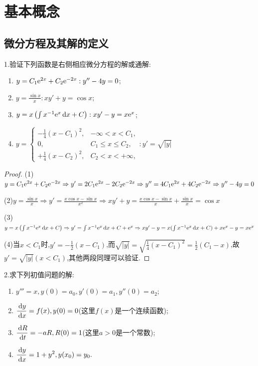 \chapter{基本概念}


\section{微分方程及其解的定义}


1.验证下列函数是右侧相应微分方程的解或通解:
\begin{enumerate}[(1)]
\item $y=C_1\mathrm{e}^{2x}+C_2\mathrm{e}^{-2x}:y''-4y=0$;
\item $\displaystyle y=\frac{\sin x}{x}:xy'+y=\cos x$;
\item $y=x\left(\int x^{-1}\mathrm{e}^x\,\mathrm{d} x+C\right):xy'-y=x\mathrm{e}^x$;
\item $y=\begin{cases}-\frac{1}{4}(x-C_1)^2,&-\infty<x<C_1,\\0,&C_1\leq x\leq C_2,\\+\frac{1}{4}(x-C_2)^2,&C_2<x<+\infty,\end{cases}:y'=\sqrt{|y|}$
\end{enumerate}

\begin{proof}(1)$y=C_1\mathrm{e}^{2x}+C_2\mathrm{e}^{-2x}\Rightarrow y'=2C_1\mathrm{e}^{2x}-2C_2\mathrm{e}^{-2x}\Rightarrow y''=4C_1\mathrm{e}^{2x}+4C_2\mathrm{e}^{-2x}\Rightarrow y''-4y=0$

(2)$y=\frac{\sin x}{x}\Rightarrow y'=\frac{x\cos x-\sin x}{x^2}\Rightarrow xy'+y=\frac{x\cos x-\sin x}{x}+\frac{\sin x}{x}=\cos x$

(3)$y=x\left(\int x^{-1}\mathrm{e}^x\,\mathrm{d} x+C\right)\Rightarrow y'=\int x^{-1}\mathrm{e}^x\,\mathrm{d} x+C+\mathrm{e}^x\Rightarrow xy'-y=x(\int x^{-1}\mathrm{e}^x\,\mathrm{d} x+C)+x\mathrm{e}^x-y=x\mathrm{e}^x$

(4)当$x<C_1$时,$y'=-\frac{1}{2}(x-C_1)$,而$\sqrt{|y|}=\sqrt{\frac{1}{4}(x-C_1)^2}=\frac{1}{2}(C_1-x)$,故$y'=\sqrt{|y|}(x<C_1)$,其他两段同理可以验证.
\end{proof}

2.求下列初值问题的解:
\begin{enumerate}[(1)]
\item $y'''=x,y(0)=a_0,y'(0)=a_1,y''(0)=a_2;$
\item $\displaystyle\frac{\,\mathrm{d} y}{\,\mathrm{d} x}=f(x),y(0)=0$(这里$f(x)$是一个连续函数);
\item $\displaystyle\frac{\,\mathrm{d} R}{\,\mathrm{d} t}=-aR,R(0)=1$(这里$a>0$是一个常数);
\item $\displaystyle\frac{\,\mathrm{d} y}{\,\mathrm{d} x}=1+y^2,y(x_0)=y_0.$
\end{enumerate}

